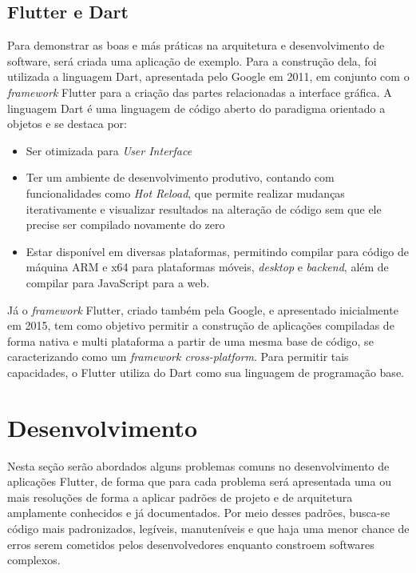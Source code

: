 \documentclass[12pt, %
openright, 
oneside, %
a4paper,    %
brazil]{facom-ufu-abntex2}
\begin{document}
\section{Flutter e Dart}
Para demonstrar as boas e más práticas na arquitetura e desenvolvimento de software, será criada uma aplicação de exemplo. Para a construção dela, foi utilizada a linguagem Dart, apresentada pelo Google em 2011, em conjunto com o \textit{framework} Flutter para a criação das partes relacionadas a interface gráfica. A linguagem Dart é uma linguagem de código aberto do paradigma orientado a objetos e se destaca por:
\begin{itemize}
    \item Ser otimizada para \textit{User Interface}
    \item Ter um ambiente de desenvolvimento produtivo, contando com funcionalidades como \textit{Hot Reload}, que permite realizar mudanças iterativamente e visualizar resultados na alteração de código sem que ele precise ser compilado novamente do zero
    \item Estar disponível em diversas plataformas, permitindo compilar para código de máquina ARM e x64 para plataformas móveis, \textit{desktop} e \textit{backend}, além de compilar para JavaScript para a web.
\end{itemize}
Já o \textit{framework} Flutter, criado também pela Google, e apresentado inicialmente em 2015, tem como objetivo permitir a construção de aplicações compiladas de forma nativa e multi plataforma a partir de uma mesma base de código, se caracterizando como um \textit{framework cross-platform}. Para permitir tais capacidades, o Flutter utiliza do Dart como sua linguagem de programação base.



\chapter{Desenvolvimento}
Nesta seção serão abordados alguns problemas comuns no desenvolvimento de aplicações Flutter, de forma que para cada problema será apresentada uma ou mais resoluções de forma a aplicar padrões de projeto e de arquitetura amplamente conhecidos e já documentados. Por meio desses padrões, busca-se código mais padronizados, legíveis, manuteníveis e que haja uma menor chance de erros serem cometidos pelos desenvolvedores enquanto constroem softwares complexos.
\end{document}
